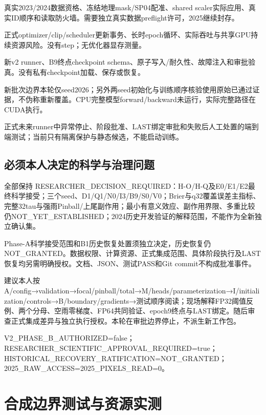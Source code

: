\documentclass[UTF8,fontset=fandol,10pt]{ctexart}
\begin{document}
\noindent\textbullet\quad 真实2023/\allowbreak{}2024数据资格、冻结地理mask/\allowbreak{}SP04配准、shared scaler实际应用、真实ID顺序和读取防火墙。需要独立真实数据preflight许可，2025继续封存。\par
\noindent\textbullet\quad 正式optimizer/\allowbreak{}clip/\allowbreak{}scheduler更新事务、长时epoch循环、实际吞吐与共享GPU持续资源风险。没有step；无优化器显存测量。\par
\noindent\textbullet\quad 新v2 runner、B9终点checkpoint schema、原子写入/\allowbreak{}耐久性、故障注入和审批验真。没有私有checkpoint加载、保存或恢复。\par
\noindent\textbullet\quad 新批次边界本轮仅seed2026；另外两seed初始化与训练顺序核验使用原始已通过证据，不伪称重新覆盖。CPU完整模型forward/\allowbreak{}backward未运行，实际完整路径在CUDA执行。\par
\noindent\textbullet\quad 正式未来runner中异常停止、阶段批准、LAST绑定审批和失败后人工处置的端到端测试；当前只有隔离保护与静态候选，不能启动训练。\par

\subsection{必须本人决定的科学与治理问题}

全部保持 RESEARCHER\_\allowbreak{}DECISION\_\allowbreak{}REQUIRED：H-O/\allowbreak{}H-Q及E0/\allowbreak{}E1/\allowbreak{}E2最终科学接受；三个seed、D1/\allowbreak{}Q1/\allowbreak{}N0/\allowbreak{}I3/\allowbreak{}B9/\allowbreak{}S0/\allowbreak{}V0；Brier与q32覆盖误差主指标、完整32tau与强雨Pinball/\allowbreak{}上尾副作用；最小有意义效应、副作用界限、多重比较仍NOT\_\allowbreak{}YET\_\allowbreak{}ESTABLISHED；2024历史开发验证的解释范围，不能作为全新独立确认集。

Phase-A科学接受范围和B1历史恢复处置须独立决定，历史恢复仍NOT\_\allowbreak{}GRANTED。数据权限、计算资源、正式集成范围、具体阶段执行及LAST恢复均另需明确授权。文档、JSON、测试PASS和Git commit不构成批准事件。

建议本人按 A/\allowbreak{}config→validation→focal/\allowbreak{}pinball/\allowbreak{}total→M/\allowbreak{}heads/\allowbreak{}parameterization→I/\allowbreak{}initialization/\allowbreak{}controls→B/\allowbreak{}boundary/\allowbreak{}gradients→测试顺序阅读；现场解释FP32阈值反例、两个分母、空雨零梯度、FP64共同验证、epoch9终点与LAST绑定。随后审查正式集成差异与独立执行授权。本轮在审批边界停止，不派生新工作包。

V2\_\allowbreak{}PHASE\_\allowbreak{}B\_\allowbreak{}AUTHORIZED=false；RESEARCHER\_\allowbreak{}SCIENTIFIC\_\allowbreak{}APPROVAL\_\allowbreak{}REQUIRED=true；HISTORICAL\_\allowbreak{}RECOVERY\_\allowbreak{}RATIFICATION=NOT\_\allowbreak{}GRANTED；2025\_\allowbreak{}RAW\_\allowbreak{}ACCESS=2025\_\allowbreak{}PIXELS\_\allowbreak{}READ=0。
\clearpage\section{合成边界测试与资源实测}
\end{document}
